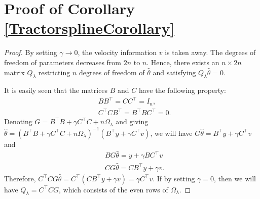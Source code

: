 \section{Proof of Corollary \ref{TractorsplineCorollary}}\label{proofofCorollary}
\begin{proof}
By setting $\gamma\to 0$, the velocity information $v$ is taken away. The degrees of freedom of parameters decreases from $2n$ to $n$. Hence, there exists an $n\times 2n$ matrix $Q_\lambda$ restricting $n$ degrees of freedom of $\hat{\theta}$ and satisfying $Q_\lambda\hat{\theta}=0$.

It is easily seen that the matrices $B$ and $C$ have the following property:  
\begin{align*}
& BB^\top=CC^\top=I_n, \\
& C^\top CB^\top=B^\top BC^\top=0.
\end{align*}
Denoting $G=B^\top B+ \gamma C^\top C +n\Omega_\lambda$ and giving $\hat{\theta} =(B^\top B+ \gamma C^\top C +n\Omega_\lambda)^{-1}(B^\top y+\gamma C^\top v)$, we will have $G\hat{\theta}=B^\top y+\gamma C^\top v$ and 
\begin{align*}
& BG\hat{\theta}=y+\gamma BC^\top v\\
& CG\hat{\theta}=CB^\top y+\gamma v.
\end{align*}
Therefore, $C^\top CG\hat{\theta}=C^\top (CB^\top y+\gamma v) = \gamma C^\top v$. If by setting $\gamma=0$, then we will have $Q_\lambda = C^\top CG$, which consists of the even rows of $\Omega_\lambda$.



\end{proof}
